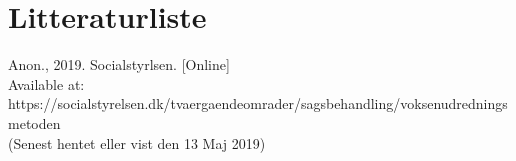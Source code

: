 \newpage
\chapter{Litteraturliste}
Anon., 2019. Socialstyrlsen. [Online] \\
Available at: https://socialstyrelsen.dk/tvaergaendeomrader/sagsbehandling/voksenudredningsmetoden \\
(Senest hentet eller vist den 13 Maj 2019)\\